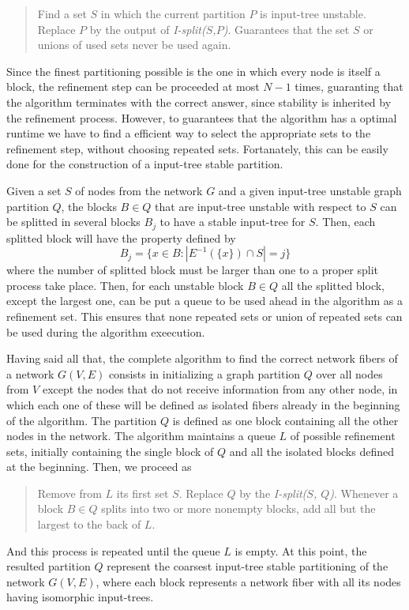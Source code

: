 \documentclass[12pt]{diazessay} %
\begin{document}
\begin{quotation}
	Find a set $S$ in which the current partition $P$ is input-tree unstable. Replace $P$ by the output of \textit{I-split($S$,$P$)}. Guarantees that the set $S$ or unions of used sets never be used again.
\end{quotation}

Since the finest partitioning possible is the one in which every node is itself a block, the refinement step can be proceeded at most $N-1$ times, guaranting that the algorithm terminates with the correct answer, since stability is inherited by the refinement process. However, to guarantees that the algorithm has a optimal runtime we have to find a efficient way to select the appropriate sets to the refinement step, without choosing repeated sets. Fortanately, this can be easily done for the construction of a input-tree stable partition.

Given a set $S$ of nodes from the network $G$ and a given input-tree unstable graph partition $Q$, the blocks $B \in Q$ that are input-tree unstable with respect to $S$ can be splitted in several blocks $B_j$ to have a stable input-tree for $S$. Then, each splitted block will have the property defined by
\begin{equation}
	B_j = \{ x \in B : | E^{-1}(\{x\}) \cap S | = j \}
\end{equation}
where the number of splitted block must be larger than one to a proper split process take place. Then, for each unstable block $B \in Q$ all the splitted block, except the largest one, can be put a queue to be used ahead in the algorithm as a refinement set. This ensures that none repeated sets or union of repeated sets can be used during the algorithm exeecution.

Having said all that, the complete algorithm to find the correct network fibers of a network $G(V, E)$ consists in initializing a graph partition $Q$ over all nodes from $V$ except the nodes that do not receive information from any other node, in which each one of these will be defined as isolated fibers already in the beginning of the algorithm. The partition $Q$ is defined as one block containing all the other nodes in the network. The algorithm maintains a queue $L$ of possible refinement sets, initially containing the single block of $Q$ and all the isolated blocks defined at the beginning. Then, we proceed as
\begin{quotation}
	Remove from $L$ its first set $S$. Replace $Q$ by the \textit{I-split($S$, $Q$)}. Whenever a block $B \in Q$ splits into two or more nonempty blocks, add all but the largest to the back of $L$.
\end{quotation}
And this process is repeated until the queue $L$ is empty. At this point, the resulted partition $Q$ represent the coarsest input-tree stable partitioning of the network $G(V, E)$, where each block represents a network fiber with all its nodes having isomorphic input-trees.
\end{document}
